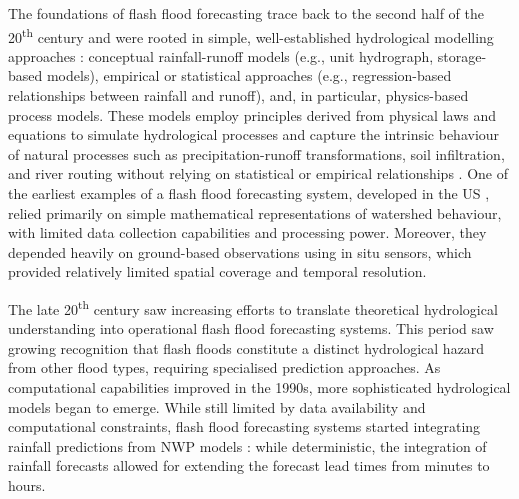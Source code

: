 The  foundations of flash flood forecasting trace back to the second half of the 20\textsuperscript{th} century and were rooted in simple, well-established hydrological modelling approaches \citep{Beven_2025}: conceptual rainfall-runoff models (e.g., unit hydrograph, storage-based models), empirical or statistical approaches (e.g., regression-based relationships between rainfall and runoff), and, in particular, physics-based process models. These models employ principles derived from physical laws and equations to simulate hydrological processes and capture the intrinsic behaviour of natural processes such as precipitation-runoff transformations, soil infiltration, and river routing without relying on statistical or empirical relationships \citep{Singh_2024, Panigrahi_2025}. One of the earliest examples of a flash flood forecasting system, developed in the US \citep{Georgakakos_1987}, relied primarily on simple mathematical representations of watershed behaviour, with limited data collection capabilities and processing power. Moreover, they depended heavily on ground-based observations using in situ sensors, which provided relatively limited spatial coverage and temporal resolution. 

The  late 20\textsuperscript{th} century saw increasing efforts to translate theoretical hydrological understanding into operational flash flood forecasting systems. This period saw growing recognition that flash floods constitute a distinct hydrological hazard from other flood types, requiring specialised prediction approaches. As computational capabilities improved in the 1990s, more sophisticated hydrological models began to emerge. While still limited by data availability and computational constraints, flash flood forecasting systems started integrating rainfall predictions from NWP models \citep{Collier_2007}: while deterministic, the integration of rainfall forecasts allowed for extending the forecast lead times from minutes to hours. 

